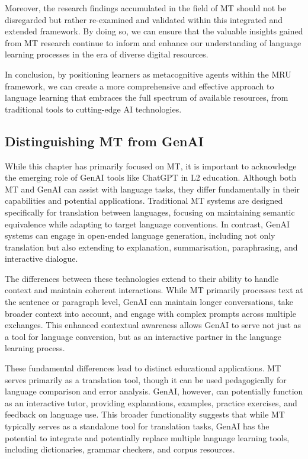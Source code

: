 \documentclass[output=paper]{langscibook}
\begin{document}
Moreover, the research findings accumulated in the field of MT should not be disregarded but rather re-examined and validated within this integrated and extended framework. By doing so, we can ensure that the valuable insights gained from MT research continue to inform and enhance our understanding of language learning processes in the era of diverse digital resources.

In conclusion, by positioning learners as metacognitive agents within the MRU framework, we can create a more comprehensive and effective approach to language learning that embraces the full spectrum of available resources, from traditional tools to cutting-edge AI technologies.

\subsection{Distinguishing MT from GenAI}

While this chapter has primarily focused on MT, it is important to acknowledge the emerging role of GenAI tools like ChatGPT in L2 education. Although both MT and GenAI can assist with language tasks, they differ fundamentally in their capabilities and potential applications. Traditional MT systems are designed specifically for translation between languages, focusing on maintaining semantic equivalence while adapting to target language conventions. In contrast, GenAI systems can engage in open-ended language generation, including not only translation but also extending to explanation, summarisation, paraphrasing, and interactive dialogue.

The differences between these technologies extend to their ability to handle context and maintain coherent interactions. While MT primarily processes text at the sentence or paragraph level, GenAI can maintain longer conversations, take broader context into account, and engage with complex prompts across multiple exchanges. This enhanced contextual awareness allows GenAI to serve not just as a tool for language conversion, but as an interactive partner in the language learning process.

These fundamental differences lead to distinct educational applications. MT serves primarily as a translation tool, though it can be used pedagogically for language comparison and error analysis. GenAI, however, can potentially function as an interactive tutor, providing explanations, examples, practice exercises, and feedback on language use. This broader functionality suggests that while MT typically serves as a standalone tool for translation tasks, GenAI has the potential to integrate and potentially replace multiple language learning tools, including dictionaries, grammar checkers, and corpus resources.
\end{document}
